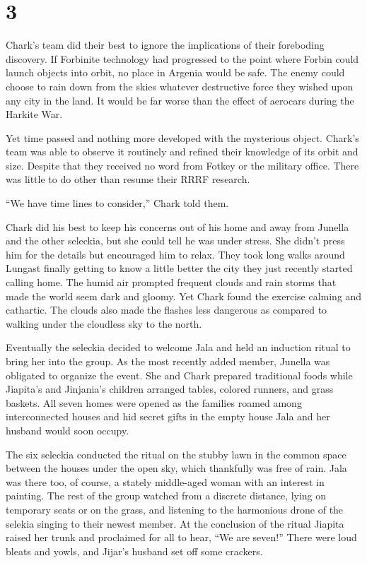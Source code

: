 
\chapter{3}

Chark's team did their best to ignore the implications of their foreboding discovery. If
Forbinite technology had progressed to the point where Forbin could launch objects into orbit,
no place in Argenia would be safe. The enemy could choose to rain down from the skies whatever
destructive force they wished upon any city in the land. It would be far worse than the effect
of aerocars during the Harkite War.

Yet time passed and nothing more developed with the mysterious object. Chark's team was able to
observe it routinely and refined their knowledge of its orbit and size. Despite that they
received no word from Fotkey or the military office. There was little to do other than resume
their RRRF research.

``We have time lines to consider,'' Chark told them.

Chark did his best to keep his concerns out of his home and away from Junella and the other
seleckia, but she could tell he was under stress. She didn't press him for the details but
encouraged him to relax. They took long walks around Lungast finally getting to know a little
better the city they just recently started calling home. The humid air prompted frequent clouds
and rain storms that made the world seem dark and gloomy. Yet Chark found the exercise calming
and cathartic. The clouds also made the flashes less dangerous as compared to walking under the
cloudless sky to the north.

Eventually the seleckia decided to welcome Jala and held an induction ritual to bring her into
the group. As the most recently added member, Junella was obligated to organize the event. She
and Chark prepared traditional foods while Jiapita's and Jinjania's children arranged tables,
colored runners, and grass baskets. All seven homes were opened as the families roamed among
interconnected houses and hid secret gifts in the empty house Jala and her husband would soon
occupy.

The six seleckia conducted the ritual on the stubby lawn in the common space between the houses
under the open sky, which thankfully was free of rain. Jala was there too, of course, a stately
middle-aged woman with an interest in painting. The rest of the group watched from a discrete
distance, lying on temporary seats or on the grass, and listening to the harmonious drone of the
selekia singing to their newest member. At the conclusion of the ritual Jiapita raised her trunk
and proclaimed for all to hear, ``We are seven!'' There were loud bleats and yowls, and Jijar's
husband set off some crackers.

